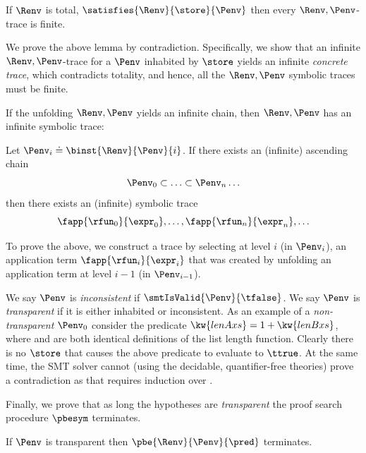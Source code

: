 \begin{lemma}\label{lem:finite-trace}
If $\Renv$ is total, $\satisfies{\Renv}{\store}{\Penv}$
then every $\Renv,\Penv$-trace is finite.
\end{lemma}

We prove the above lemma by contradiction.
Specifically, we show that an infinite
$\Renv,\Penv$-trace for a $\Penv$
inhabited by $\store$ yields an
infinite \emph{concrete trace}, which
contradicts totality, and hence, all the
$\Renv, \Penv$ symbolic traces
must be finite.

%
If the unfolding $\Renv, \Penv$ yields
an infinite chain, then $\Renv, \Penv$
has an infinite symbolic trace:

\begin{lemma}  \label{lem:chain}
Let $\Penv_i \doteq \binst{\Renv}{\Penv}{i}$.
If there exists an (infinite) ascending chain
  $$\Penv_0 \subset \ldots \subset \Penv_n \ldots$$
then there exists an (infinite) symbolic trace
  $$\fapp{\rfun_0}{\expr_0},\ldots,\fapp{\rfun_n}{\expr_n},\ldots$$
\end{lemma}

To prove the above,
we construct a trace
by selecting at level $i$
(\ie in $\Penv_i$),
an application term
$\fapp{\rfun_i}{\expr_i}$
that was created by
unfolding an application
term at level $i-1$
(\ie in $\Penv_{i-1}$).


%
We say $\Penv$ is \emph{inconsistent}
if $\smtIsValid{\Penv}{\tfalse}$.
%
We say $\Penv$ is \emph{transparent}
if it is either inhabited or inconsistent.
%
As an example of a \emph{non-transparent}
$\Penv_0$ consider the predicate
$\kw{lenA xs} = 1 + \kw{lenB xs}$,
where  and  are both
identical definitions of the list length
function.
%
Clearly there is no $\store$ that causes
the above predicate to evaluate to $\ttrue$.
%
At the same time, the SMT solver cannot
(using the decidable, quantifier-free theories)
prove a contradiction as that requires
induction over .


%
Finally, we prove that as long the hypotheses
are \emph{transparent} the proof search
procedure $\pbesym$ terminates.

\begin{theorem} \label{thm:termination}
  If $\Penv$ is transparent
  then $\pbe{\Renv}{\Penv}{\pred}$ terminates.
\end{theorem}

